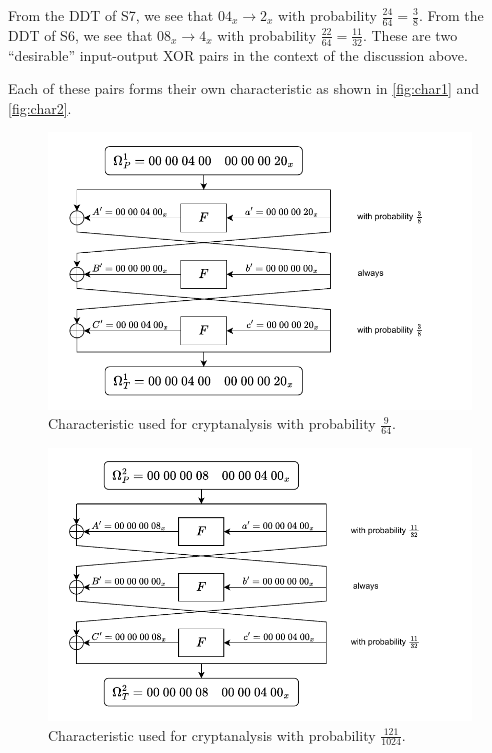 \documentclass[journal,12pt,twocolumn]{IEEEtran}
\begin{document}
From the DDT of S7, we see that \(04_x \rightarrow 2_x\) with probability
\(\frac{24}{64} = \frac{3}{8}\). From the DDT of S6, we see that \(08_x
\rightarrow 4_x\) with probability \(\frac{22}{64} = \frac{11}{32}\). These are
two ``desirable'' input-output XOR pairs in the context of the discussion above.

Each of these pairs forms their own characteristic as shown in
\autoref{fig:char1} and \autoref{fig:char2}.

\begin{figure}[!ht]
    \centering
    \includegraphics[width=\columnwidth]{images/char1.pdf}
    \caption{Characteristic used for cryptanalysis with probability \(\frac{9}{64}\).}
    \label{fig:char1}
\end{figure}

\begin{figure}[!ht]
    \centering
    \includegraphics[width=\columnwidth]{images/char2.pdf}
    \caption{Characteristic used for cryptanalysis with probability \(\frac{121}{1024}\).}
    \label{fig:char2}
\end{figure}
\end{document}
